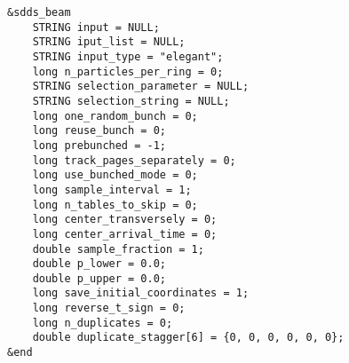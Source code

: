 \documentclass[11pt]{article}
\begin{document}
\begin{verbatim}
&sdds_beam
    STRING input = NULL;
    STRING iput_list = NULL;
    STRING input_type = "elegant";
    long n_particles_per_ring = 0;
    STRING selection_parameter = NULL;
    STRING selection_string = NULL;
    long one_random_bunch = 0;
    long reuse_bunch = 0;
    long prebunched = -1;
    long track_pages_separately = 0;
    long use_bunched_mode = 0;
    long sample_interval = 1;
    long n_tables_to_skip = 0;
    long center_transversely = 0;
    long center_arrival_time = 0;
    double sample_fraction = 1;
    double p_lower = 0.0;
    double p_upper = 0.0;
    long save_initial_coordinates = 1;
    long reverse_t_sign = 0;
    long n_duplicates = 0;
    double duplicate_stagger[6] = {0, 0, 0, 0, 0, 0};
&end
\end{verbatim}
\end{document}
